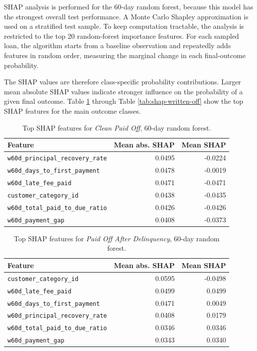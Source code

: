 \documentclass[11pt]{article}
\begin{document}
SHAP analysis is performed for the 60-day random forest, because this model has the strongest overall test performance. A Monte Carlo Shapley approximation is used on a stratified test sample. To keep computation tractable, the analysis is restricted to the top 20 random-forest importance features. For each sampled loan, the algorithm starts from a baseline observation and repeatedly adds features in random order, measuring the marginal change in each final-outcome probability.

The SHAP values are therefore class-specific probability contributions. Larger mean absolute SHAP values indicate stronger influence on the probability of a given final outcome. Table \ref{tab:shap-clean-paid} through Table \ref{tab:shap-written-off} show the top SHAP features for the main outcome classes.

\begin{table}[h]
\centering
\caption{Top SHAP features for \textit{Clean Paid Off}, 60-day random forest.}
\label{tab:shap-clean-paid}
\begin{tabular}{lrr}
\toprule
Feature & Mean abs. SHAP & Mean SHAP \\
\midrule
\texttt{w60d\_principal\_recovery\_rate} & 0.0495 & -0.0224 \\
\texttt{w60d\_days\_to\_first\_payment} & 0.0478 & -0.0019 \\
\texttt{w60d\_late\_fee\_paid} & 0.0471 & -0.0471 \\
\texttt{customer\_category\_id} & 0.0438 & -0.0435 \\
\texttt{w60d\_total\_paid\_to\_due\_ratio} & 0.0426 & -0.0426 \\
\texttt{w60d\_payment\_gap} & 0.0408 & -0.0373 \\
\bottomrule
\end{tabular}
\end{table}

\begin{table}[h]
\centering
\caption{Top SHAP features for \textit{Paid Off After Delinquency}, 60-day random forest.}
\label{tab:shap-paid-late}
\begin{tabular}{lrr}
\toprule
Feature & Mean abs. SHAP & Mean SHAP \\
\midrule
\texttt{customer\_category\_id} & 0.0595 & -0.0498 \\
\texttt{w60d\_late\_fee\_paid} & 0.0499 & 0.0499 \\
\texttt{w60d\_days\_to\_first\_payment} & 0.0471 & 0.0049 \\
\texttt{w60d\_principal\_recovery\_rate} & 0.0408 & 0.0179 \\
\texttt{w60d\_total\_paid\_to\_due\_ratio} & 0.0346 & 0.0346 \\
\texttt{w60d\_payment\_gap} & 0.0343 & 0.0340 \\
\bottomrule
\end{tabular}
\end{table}
\end{document}
